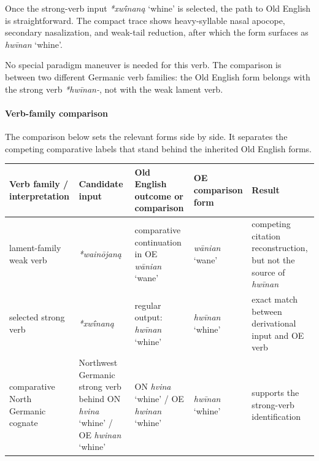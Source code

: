 \documentclass[
  british,
  a4paper,
]{article}
\newcounter{none} %
\providecommand{\Recon}[1]{\emph{*#1}}
\begin{document}
Once the strong-verb input \Recon{xwī́naną} `whine' is selected, the path
to Old English is straightforward. The compact trace shows
heavy-syllable nasal apocope, secondary nasalization, and weak-tail
reduction, after which the form surfaces as {\emph{hwīnan}} `whine'.

No special paradigm maneuver is needed for this verb. The comparison is
between two different Germanic verb families: the Old English form
belongs with the strong verb \emph{*hwīnan-}, not with the weak lament
verb.

\paragraph{Verb-family comparison}\label{verb-family-comparison}

The comparison below sets the relevant forms side by side. It separates
the competing comparative labels that stand behind the inherited Old
English forms.

{\def\LTcaptype{none} %
\begin{longtable}[]{@{}
  >{\raggedright\arraybackslash}p{}
  >{\raggedright\arraybackslash}p{}
  >{\raggedright\arraybackslash}p{}
  >{\raggedright\arraybackslash}p{}
  >{\raggedright\arraybackslash}p{}@{}}
\toprule\noalign{}
\begin{minipage}[b]{\linewidth}\raggedright
Verb family / interpretation
\end{minipage} & \begin{minipage}[b]{\linewidth}\raggedright
Candidate input
\end{minipage} & \begin{minipage}[b]{\linewidth}\raggedright
Old English outcome or comparison
\end{minipage} & \begin{minipage}[b]{\linewidth}\raggedright
OE comparison form
\end{minipage} & \begin{minipage}[b]{\linewidth}\raggedright
Result
\end{minipage} \\
\midrule\noalign{}
\endhead
\bottomrule\noalign{}
\endlastfoot
lament-family weak verb & {\emph{*wainōjaną}} & comparative continuation
in OE {\emph{wānian}} `wane' & {\emph{wānian}} `wane' & competing
citation reconstruction, but not the source of \emph{hwīnan} \\
selected strong verb & {\emph{*xwī́naną}} & regular output:
{\emph{hwīnan}} `whine' & {\emph{hwīnan}} `whine' & exact match between
derivational input and OE verb \\
comparative North Germanic cognate & Northwest Germanic strong verb
behind ON {\emph{hvina}} `whine' / OE {\emph{hwinan}} `whine' & ON
{\emph{hvina}} `whine' / OE {\emph{hwinan}} `whine' & {\emph{hwīnan}}
`whine' & supports the strong-verb identification \\
\end{longtable}
}
\end{document}
